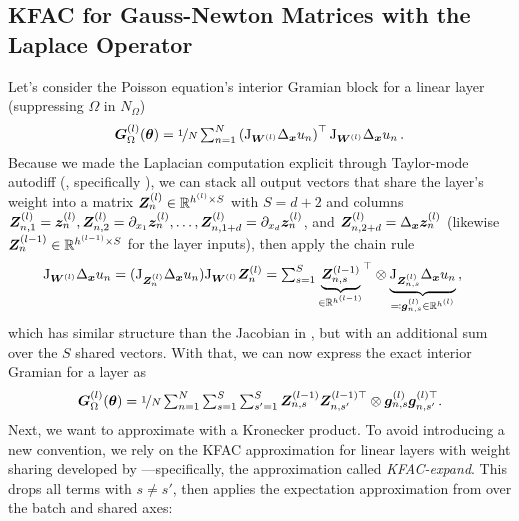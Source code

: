 \subsection{KFAC for Gauss-Newton Matrices with the Laplace Operator}\label{sec:KFAC-Laplace}
Let's consider the Poisson equation's interior Gramian block for a linear layer (suppressing $\Omega$ in $N_{\Omega}$)
\begin{align*}
  {\bm{G}}^{(l)}_\Omega({\bm{\theta}})
  =
  \nicefrac{1}{N}
  \textstyle
  \sum_{n=1}^{N}
  \left(
  \mathrm{J}_{{\bm{W}}^{(l)}} \Delta_{\bm{x}} u_n  \right)^\top
  \mathrm{J}_{{\bm{W}}^{(l)}} \Delta_{\bm{x}} u_n\,.
\end{align*}
Because we made the Laplacian computation explicit through Taylor-mode autodiff (, specifically ), we can stack all output vectors that share the layer's weight into a matrix
${\bm{Z}}_n^{(l)} \in {\mathbb{R}}^{h^{(l)} \times S}$ with $S = d+2$ and columns ${\bm{Z}}_{n, 1}^{(l)} = {\bm{z}}_n^{(l)}, {\bm{Z}}_{n, 2}^{(l)} = \partial_{x_1}{\bm{z}}_n^{(l)}, \dots, {\bm{Z}}_{n, 1+d}^{(l)} = \partial_{x_d}{\bm{z}}_n^{(l)}$, and ${\bm{Z}}_{n, 2+d}^{(l)} = \Delta_{\bm{x}}{\bm{z}}_n^{(l)}$ (likewise ${\bm{Z}}_n^{(l-1)} \in {\mathbb{R}}^{h^{(l-1)} \times S}$ for the layer inputs), then apply the chain rule
\begin{align*}
  \mathrm{J}_{{\bm{W}}^{(l)}} \Delta_{\bm{x}} u_n
  &=
    (\mathrm{J}_{{\bm{Z}}_n^{(l)}}\Delta_{\bm{x}} u_n) \mathrm{J}_{{\bm{W}}^{(l)}} {\bm{Z}}_n^{(l)}
    =
    \textstyle
    \sum_{s=1}^S
    {
    \underbrace{{\bm{Z}}^{(l-1)}_{n,s}}_{\in {\mathbb{R}}^{h^{(l-1)}}}
    }^{\top}
    \otimes
    \underbrace{\mathrm{J}_{{\bm{Z}}^{(l)}_{n,s}} \Delta_{{\bm{x}}}u_n}_{\eqqcolon {\bm{g}}_{n,s}^{(l)} \in {\mathbb{R}}^{h^{(l)}}}\,,
\end{align*}
which has similar structure than the Jacobian in , but with an additional sum over the $S$ shared vectors. With that, we can now express the exact interior Gramian for a layer as
\begin{equation}\label{eq:laplace_gramian_block_exact}
  {\bm{G}}^{(l)}_\Omega({\bm{\theta}})
  =
  \nicefrac{1}{N}
  \textstyle
  \sum_{n=1}^N
  \sum_{s=1}^S
  \sum_{s'=1}^S
  {\bm{Z}}^{(l-1)}_{n,s} {\bm{Z}}^{(l-1)\top}_{n,s'} \otimes {\bm{g}}_{n,s}^{(l)} {\bm{g}}_{n,s'}^{(l)\top}.
\end{equation}
Next, we want to approximate  with a Kronecker product.
To avoid introducing a new convention, we rely on the KFAC approximation for linear layers with weight sharing developed by \citet{eschenhagen2023kroneckerfactored}---specifically, the approximation called \emph{KFAC-expand}.
This drops all terms with $s\neq s'$, then applies the expectation approximation from  over the batch and shared axes:
